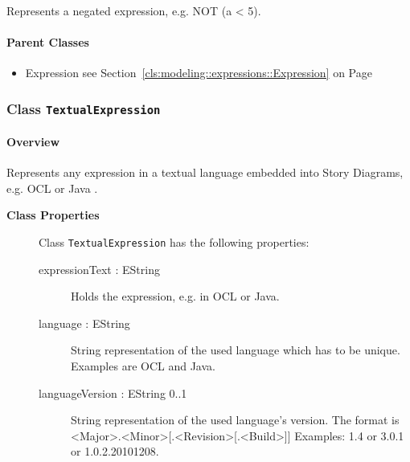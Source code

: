 	
			
Represents a negated expression, e.g. NOT (a < 5).	
		
	



\paragraph{Parent Classes}
\begin{itemize}
\item Expression see Section~\ref{cls:modeling::expressions::Expression} on Page~\pageref{cls:modeling::expressions::Expression}\end{itemize}
\subsubsection{\Large{Class \bfseries \texttt{TextualExpression}\normalfont}}
\label{cls:modeling::expressions::TextualExpression} 
\paragraph{Overview}

	
			
Represents any expression in a textual language embedded into Story Diagrams, e.g. OCL or Java .	
		
	


\begin{description}

	\item[\textbf{Class Properties}] Class \texttt{TextualExpression} has the following properties:
	\begin{description}
\item[expressionText : EString 	]

\hspace{\fill}
\nopagebreak


	
			
Holds the expression, e.g. in OCL or Java.	
		
	
\item[language : EString 	]

\hspace{\fill}
\nopagebreak


	
			
String representation of the used language which has to be unique. Examples are OCL and Java.	
		
	
\item[languageVersion : EString 			0..1]

\hspace{\fill}
\nopagebreak


	
			
String representation of the used language's version. The format is <Major>.<Minor>[.<Revision>[.<Build>]]
Examples: 1.4 or 3.0.1 or 1.0.2.20101208.	
		
	
	\end{description}
	
	

\end{description}

